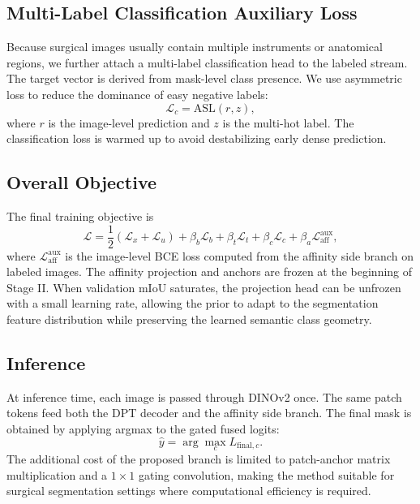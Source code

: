 \documentclass[journal,twoside]{IEEEtran}
\begin{document}
\subsection{Multi-Label Classification Auxiliary Loss}
Because surgical images usually contain multiple instruments or anatomical regions, we further attach a multi-label classification head to the labeled stream. The target vector is derived from mask-level class presence. We use asymmetric loss to reduce the dominance of easy negative labels:
\begin{equation}
    \mathcal{L}_{c} = \mathrm{ASL}(r, z),
\end{equation}
where $r$ is the image-level prediction and $z$ is the multi-hot label. The classification loss is warmed up to avoid destabilizing early dense prediction.

\subsection{Overall Objective}
The final training objective is
\begin{equation}
    \mathcal{L} =
    \frac{1}{2}(\mathcal{L}_{x}+\mathcal{L}_{u})
    + \beta_b \mathcal{L}_{b}
    + \beta_t \mathcal{L}_{t}
    + \beta_c \mathcal{L}_{c}
    + \beta_a \mathcal{L}_{\mathrm{aff}}^{\mathrm{aux}},
\end{equation}
where $\mathcal{L}_{\mathrm{aff}}^{\mathrm{aux}}$ is the image-level BCE loss computed from the affinity side branch on labeled images. The affinity projection and anchors are frozen at the beginning of Stage II. When validation mIoU saturates, the projection head can be unfrozen with a small learning rate, allowing the prior to adapt to the segmentation feature distribution while preserving the learned semantic class geometry.

\subsection{Inference}
At inference time, each image is passed through DINOv2 once. The same patch tokens feed both the DPT decoder and the affinity side branch. The final mask is obtained by applying argmax to the gated fused logits:
\begin{equation}
    \hat{y} = \arg\max_c L_{\mathrm{final},c}.
\end{equation}
The additional cost of the proposed branch is limited to patch-anchor matrix multiplication and a $1\times1$ gating convolution, making the method suitable for surgical segmentation settings where computational efficiency is required.
\end{document}
